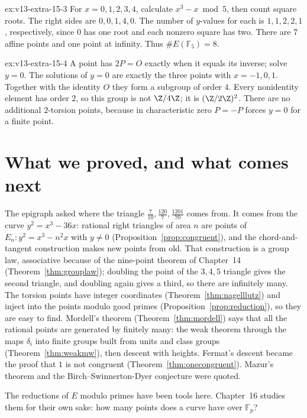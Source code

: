 \begin{solution}{ex:v13-extra-15-3}
\idea For $x=0,1,2,3,4$, calculate $x^3-x\bmod5$, then count square roots.
\writeup The right sides are $0,0,1,4,0$. The number of $y$-values for each is $1,1,2,2,1$, respectively, since $0$ has one root and each nonzero square has two. There are $7$ affine points and one point at infinity. Thus $\#E(\mathbb F_5)=8$.
\end{solution}

\begin{solution}{ex:v13-extra-15-4}
\idea A point has $2P=O$ exactly when it equals its inverse; solve $y=0$.
\writeup The solutions of $y=0$ are exactly the three points with $x=-1,0,1$. Together with the identity $O$ they form a subgroup of order $4$. Every nonidentity element has order $2$, so this group is not $\Z/4\Z$; it is $(\Z/2\Z)^2$. There are no additional $2$-torsion points, because in characteristic zero $P=-P$ forces $y=0$ for a finite point.
\end{solution}

\section{What we proved, and what comes next}

The epigraph asked where the triangle $\frac7{10},\frac{120}7,\frac{1201}{70}$ comes from. It comes from the curve $y^2=x^3-36x$: rational
right triangles of area $n$ are points of $E_n:y^2=x^3-n^2x$ with $y\ne0$ (Proposition~\ref{prop:congruent}), and the chord-and-tangent
construction makes new points from old. That construction is a group law, associative because of the nine-point theorem of Chapter~14
(Theorem~\ref{thm:grouplaw}); doubling the point of the $3,4,5$ triangle gives the second triangle, and doubling again gives a third, so
there are infinitely many. The torsion points have integer coordinates (Theorem~\ref{thm:nagelllutz}) and inject into the points modulo good
primes (Proposition~\ref{prop:reduction}), so they are easy to find. Mordell's theorem (Theorem~\ref{thm:mordell}) says that all the
rational points are generated by finitely many: the weak theorem through the maps $\delta_i$ into finite groups built from units and class
groups (Theorem~\ref{thm:weakmw}), then descent with heights. Fermat's descent became the proof that $1$ is not congruent
(Theorem~\ref{thm:onecongruent}). Mazur's theorem and the Birch--Swinnerton-Dyer conjecture were quoted.

The reductions of $E$ modulo primes have been tools here. Chapter~16 studies them for their own sake: how many points does a curve
have over $\mathbb F_p$?

